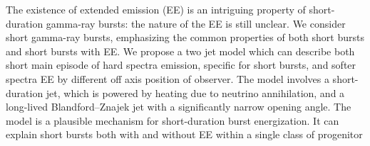 


\bigskip



\bigskip

\noindent The existence of extended emission (EE) is an intriguing property of short-duration gamma-ray bursts: the nature of the EE is still unclear. We consider short gamma-ray bursts, emphasizing the common properties of both short bursts and short bursts with EE. We propose a two jet model which can describe both short main episode of hard spectra emission, specific for short bursts, and softer spectra EE by different off axis position of observer. The model involves a short-duration jet, which is powered by heating due to neutrino annihilation, and a long-lived Blandford–Znajek jet with a significantly narrow opening angle. The model is a plausible mechanism for short-duration burst energization. It can explain short bursts both with and without EE within a single class of progenitor

